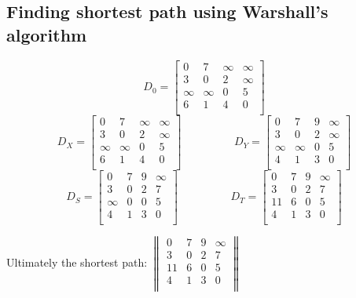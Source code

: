 \documentclass[11 pt]{article}
\begin{document}
\subsection{Finding shortest path using Warshall's algorithm}
$$
D_0=
\begin{bmatrix}
	0 & 7 & \infty & \infty \\
	3 & 0 & 2 & \infty \\
	\infty & \infty & 0 & 5 \\
	6 & 1 & 4 & 0 \\
\end{bmatrix}
$$
\vspace{0.5cm}
$$
D_X=
\begin{bmatrix}
0 & 7 & \infty & \infty \\
3 & 0 & 2 & \infty \\
\infty & \infty & 0 & 5 \\
6 & 1 & 4 & 0 \\
\end{bmatrix}
\hspace{2cm}
D_Y=
\begin{bmatrix}
0 & 7 & 9 & \infty \\
3 & 0 & 2 & \infty \\
\infty & \infty & 0 & 5 \\
4 & 1 & 3 & 0 \\
\end{bmatrix}
$$
\vspace{0.5cm}
$$
D_S=
\begin{bmatrix}
0 & 7 & 9 & \infty \\
3 & 0 & 2 & 7 \\
\infty & 0 & 0 & 5 \\
4 & 1 & 3 & 0 \\
\end{bmatrix}
\hspace{2cm}
D_T=
\begin{bmatrix}
0 & 7 & 9 & \infty \\
3 & 0 & 2 & 7 \\
11 & 6 & 0 & 5 \\
4 & 1 & 3 & 0 \\
\end{bmatrix}
$$

Ultimately the shortest path: 
$
\textrm{}
\begin{Vmatrix}
0 & 7 & 9 & \infty \\
3 & 0 & 2 & 7 \\
11 & 6 & 0 & 5 \\
4 & 1 & 3 & 0 \\
\end{Vmatrix}
$
\end{document}
